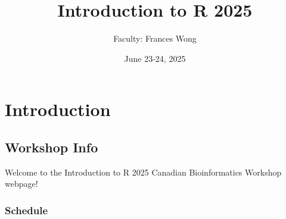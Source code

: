 \documentclass[
]{book}
\title{Introduction to R 2025}
\author{Faculty: Frances Wong}
\date{June 23-24, 2025}
\begin{document}
\maketitle

{
\setcounter{tocdepth}{1}
\tableofcontents
}
\part{Introduction}\label{part-introduction}

\chapter{Workshop Info}\label{workshop-info}

Welcome to the Introduction to R 2025 Canadian Bioinformatics Workshop webpage!

\section{Schedule}\label{schedule}
\end{document}
